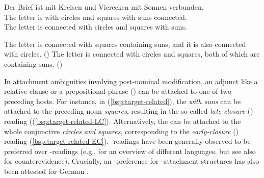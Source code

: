 \documentclass[fleqn,reqno,10pt]{article}
\newcommand{\lc}{\acro{lc}}
\newcommand{\ec}{\acro{ec}}
\begin{document}
\begin{exe}
\ex \gll Der Brief ist mit Kreisen und Vierecken mit Sonnen
  verbunden. \label{bsp:target-related}\\
The letter is with circles and squares with suns connected.\\
The letter is connected with circles and squares with suns.
\begin{xlist}
  \ex \label{bsp:target-related-LC} The letter is connected with squares containing suns, and it is
    also connected with circles. \hfill{(\lc)}
  \ex \label{bsp:target-related-EC} The letter is connected with circles and squares, both of which
    are containing suns.  \hfill{(\ec)} 
\end{xlist}
\end{exe}
In attachment ambiguities involving post-nominal modification, an
adjunct like a relative clause or a prepositional phrase ()
can be attached to one of two preceding hosts.  For instance, in
(\ref{bsp:target-related}), the  \emph{with suns} can be
attached to the preceding noun \emph{squares}, resulting in the
so-called \emph{late-closure} (\lc) reading
((\ref{bsp:target-related-LC}). Alternatively, the  can be
attached to the whole conjunctive  \emph{circles and
  squares}, corresponding to the \emph{early-closure} (\ec) reading
(\ref{bsp:target-related-EC}).  \lc-readings have been generally
observed to be preferred over \ec-readings (e.g., \cite{Fodor98} for
an overview of different languages, but see also
\cite{CliftonCarlsonFrazier2002} for counterevidence). Crucially, an
\lc-preference for -attachment structures has also been
attested for German \citep[][]{KoniecznyHemforth2000}.
\end{document}
